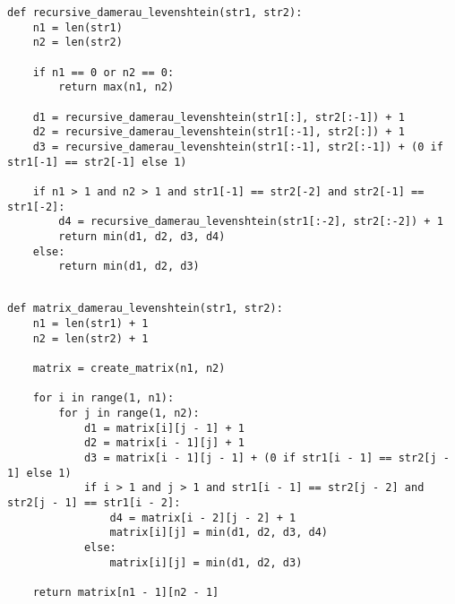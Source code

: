 \begin{center}
\captionsetup{justification=raggedright,singlelinecheck=off}
\begin{lstlisting}[label=lst:matrix,caption=Рекурсивный алгоритм нахождения расстояния Дамерау-Левенштейна]
def recursive_damerau_levenshtein(str1, str2):
	n1 = len(str1)
	n2 = len(str2)
	
	if n1 == 0 or n2 == 0:
		return max(n1, n2)
	
	d1 = recursive_damerau_levenshtein(str1[:], str2[:-1]) + 1
	d2 = recursive_damerau_levenshtein(str1[:-1], str2[:]) + 1
	d3 = recursive_damerau_levenshtein(str1[:-1], str2[:-1]) + (0 if str1[-1] == str2[-1] else 1)
	
	if n1 > 1 and n2 > 1 and str1[-1] == str2[-2] and str2[-1] == str1[-2]:
		d4 = recursive_damerau_levenshtein(str1[:-2], str2[:-2]) + 1
		return min(d1, d2, d3, d4)
	else:
		return min(d1, d2, d3)
    
\end{lstlisting}
\end{center}
\clearpage
\begin{center}
\captionsetup{justification=raggedright,singlelinecheck=off}
\begin{lstlisting}[label=lst:cache,caption=Матричный алгоритм нахождения расстояния Дамерау-Левенштейна]
def matrix_damerau_levenshtein(str1, str2):
	n1 = len(str1) + 1
	n2 = len(str2) + 1
	
	matrix = create_matrix(n1, n2)
	
	for i in range(1, n1):
		for j in range(1, n2):
			d1 = matrix[i][j - 1] + 1
			d2 = matrix[i - 1][j] + 1
			d3 = matrix[i - 1][j - 1] + (0 if str1[i - 1] == str2[j - 1] else 1)
			if i > 1 and j > 1 and str1[i - 1] == str2[j - 2] and str2[j - 1] == str1[i - 2]:
				d4 = matrix[i - 2][j - 2] + 1
				matrix[i][j] = min(d1, d2, d3, d4)
			else:
				matrix[i][j] = min(d1, d2, d3)
	
	return matrix[n1 - 1][n2 - 1]

\end{lstlisting}
\end{center}
\clearpage
